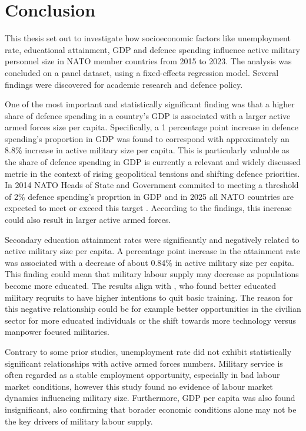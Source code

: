 \chapter{Conclusion}

This thesis set out to investigate how socioeconomic factors like unemployment rate, educational 
attainment, GDP and defence spending influence active military personnel size in NATO member countries 
from 2015 to 2023. The analysis was concluded on a panel dataset, using a fixed-effects regression model.
Several findings were discovered for academic research and defence policy.

One of the most important and statistically significant finding was that a higher share of defence 
spending in a country's GDP is associated with a larger active armed forces size per capita. Specifically, 
a 1 percentage point increase in defence spending's proportion in GDP was found to correspond with 
approximately an 8.8\% increase in active military size per capita.
This is particularly valuable as the share of defence spending in GDP is currently a relevant and 
widely discussed metric in the context of rising geopolitical tensions and shifting defence priorities.
In 2014 NATO Heads of State and Government commited to meeting a threshold of 2\% defence spending's 
proprtion in GDP and in 2025 all NATO countries are expected to meet or exceed this target \parencite{nato_defence_2025}. 
According to the findings, this increase could also result in larger active armed forces.

Secondary education attainment rates were significantly and negatively related to active military 
size per capita. A percentage point increase in the attainment rate was associated with a decrease 
of about 0.84\% in active military size per capita. This finding could mean that military labour 
supply may decrease as populations become more educated. The results align with \textcite{hof_quality_2023}, 
who found better educated military reqruits to have higher intentions to quit basic training.
The reason for this negative relationship could be for example better opportunities in the civilian 
sector for more educated individuals or the shift towards more technology versus manpower focused 
militaries.

Contrary to some prior studies, unemployment rate did not exhibit statistically significant 
relationships with active armed forces numbers. Military service is often regarded as a stable
employment opportunity, especially in bad labour market conditions, however this study found 
no evidence of labour market dynamics influencing military size. Furthermore, GDP per capita was 
also found insignificant, also confirming that borader economic conditions alone may not be the 
key drivers of military labour supply.

